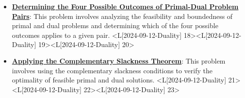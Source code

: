 \documentclass{article}%
\begin{document}
\begin{itemize}[[leftmargin=*]]
\item \href{https://www.math.purdue.edu/~yipn/421/2024-09-12-Duality.pdf#page=18}{\textbf{Determining the Four Possible Outcomes of Primal{-}Dual Problem Pairs}}: This problem involves analyzing the feasibility and boundedness of primal and dual problems and determining which of the four possible outcomes applies to a given pair. <L[2024-09-12-Duality] 18><L[2024-09-12-Duality] 19><L[2024-09-12-Duality] 20>%
\item \href{https://www.math.purdue.edu/~yipn/421/2024-09-12-Duality.pdf#page=21}{\textbf{Applying the Complementary Slackness Theorem}}: This problem involves using the complementary slackness conditions to verify the optimality of feasible primal and dual solutions. <L[2024-09-12-Duality] 21><L[2024-09-12-Duality] 22><L[2024-09-12-Duality] 23>%
\end{itemize}%
\end{document}
